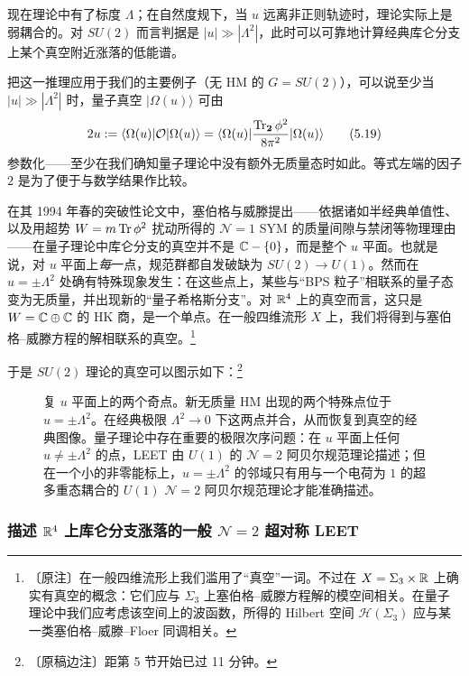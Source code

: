 现在理论中有了标度 $\Lambda$；在自然度规下，当 $u$ 远离非正则轨迹时，理论实际上是弱耦合的。对 $SU(2)$ 而言判据是 $|u|\gg|\Lambda^{2}|$，此时可以可靠地计算经典库仑分支上某个真空附近涨落的低能谱。

把这一推理应用于我们的主要例子（无 HM 的 $G=SU(2)$），可以说至少当 $|u|\gg|\Lambda^{2}|$ 时，量子真空 $|\Omega(u)\rangle$ 可由
\begin{equation}
2u:=\langle\Omega(u)|\mathcal{O}|\Omega(u)\rangle
=\langle\Omega(u)|\frac{\operatorname{Tr}_{\mathbf{2}}\phi^{2}}{8\pi^{2}}|\Omega(u)\rangle
\tag{5.19}
\end{equation}
参数化——至少在我们确知量子理论中没有额外无质量态时如此。等式左端的因子 $2$ 是为了便于与数学结果作比较。

在其 1994 年春的突破性论文中，塞伯格与威滕提出——依据诸如半经典单值性、以及用超势 $W=m\operatorname{Tr}\phi^{2}$ 扰动所得的 $\mathcal{N}=1$ SYM 的质量间隙与禁闭等物理理由——在量子理论中库仑分支的真空并不是 $\mathbb{C}-\{0\}$，而是整个 $u$ 平面。也就是说，对 $u$ 平面上\emph{每}一点，规范群都自发破缺为 $SU(2)\to U(1)$。然而在 $u=\pm\Lambda^{2}$ 处确有特殊现象发生：在这些点上，某些与“BPS 粒子”相联系的量子态变为无质量，并出现新的“量子希格斯分支”。对 $\mathbb{R}^{4}$ 上的真空而言，这只是 $W=\mathbb{C}\oplus\mathbb{C}$ 的 HK 商，是一个单点。在一般四维流形 $X$ 上，我们将得到与塞伯格--威滕方程的解相联系的真空。\footnote{〔原注〕在一般四维流形上我们滥用了“真空”一词。不过在 $X=\Sigma_{3}\times\mathbb{R}$ 上确实有真空的概念：它们应与 $\Sigma_{3}$ 上塞伯格--威滕方程解的模空间相关。在量子理论中我们应考虑该空间上的波函数，所得的 Hilbert 空间 $\mathcal{H}(\Sigma_{3})$ 应与某一类塞伯格--威滕--Floer 同调相关。}

于是 $SU(2)$ 理论的真空可以图示如下：\footnote{〔原稿边注〕距第 5 节开始已过 11 分钟。}

\begin{figure}[H]
  \centering
  \caption{复 $u$ 平面上的两个奇点。新无质量 HM 出现的两个特殊点位于 $u=\pm\Lambda^{2}$。在经典极限 $\Lambda^{2}\to0$ 下这两点并合，从而恢复到真空的经典图像。量子理论中存在重要的极限次序问题：在 $u$ 平面上任何 $u\neq\pm\Lambda^{2}$ 的点，LEET 由 $U(1)$ 的 $\mathcal{N}=2$ 阿贝尔规范理论描述；但在一个小的非零能标上，$u=\pm\Lambda^{2}$ 的邻域只有用与一个电荷为 $1$ 的超多重态耦合的 $U(1)$ $\mathcal{N}=2$ 阿贝尔规范理论才能准确描述。}
  \label{fig:uplane}
\end{figure}

\subsubsection{描述 $\mathbb{R}^{4}$ 上库仑分支涨落的一般 $\mathcal{N}=2$ 超对称 LEET}

